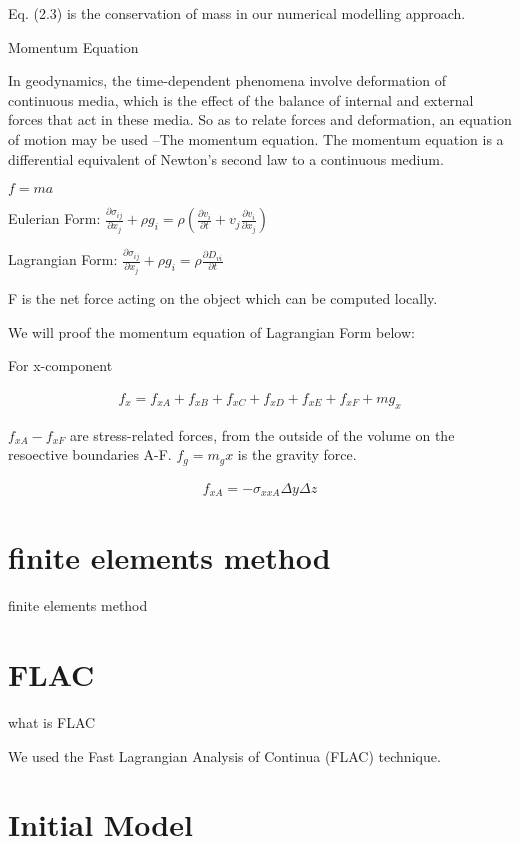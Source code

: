 Eq. (2.3) is the conservation of mass in our numerical modelling approach.


Momentum Equation

In geodynamics, the time-dependent phenomena involve deformation of continuous media, which is the effect of the balance of internal and external forces that act in these media. So as to relate forces and deformation, an equation of motion may be used --The momentum equation. The momentum equation is a differential equivalent of Newton’s second law to a continuous medium.

$f=ma$

Eulerian Form: $\frac{\partial \sigma_{ij}}{\partial x_j}+\rho g_i = \rho (\frac{\partial v_i}{\partial t}+v_j\frac{\partial v_i}{\partial x_j})$

Lagrangian Form: $\frac{\partial \sigma_{ij}}{\partial x_j}+\rho g_i = \rho \frac{\partial D_{vi}}{\partial t}$

F is the net force acting on the object which can be computed locally. 

We will proof the momentum equation of Lagrangian Form below:

For x-component

\begin{align}
f_x=f_{xA}+f_{xB}+f_{xC}+f_{xD}+f_{xE}+f_{xF}+mg_x 
\end{align}

$f_{xA}- f_{xF}$ are stress-related forces, from the outside of the volume on the resoective boundaries A-F. 
$f_g=m_gx$ is the gravity force.

\begin{align}
f_{xA} = -\sigma_{xxA}\Delta y\Delta z
\end{align}


\section{finite elements method}

finite elements method

\section{FLAC}

what is FLAC

We used the Fast Lagrangian Analysis of Continua (FLAC) technique.

\section{Initial Model}

